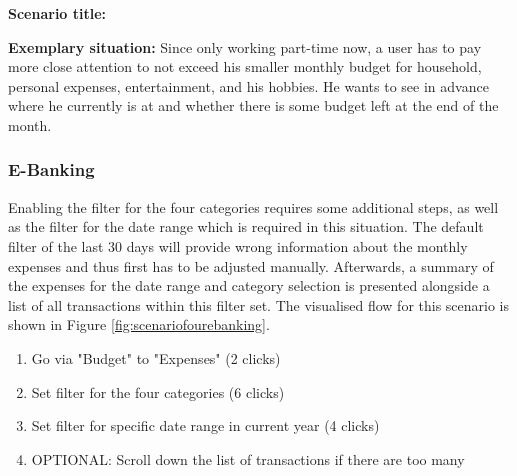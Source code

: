 \textbf{Scenario title:} \scenfour

\textbf{Exemplary situation:} Since only working part-time now, a user has to pay more close attention to not exceed his smaller monthly budget for household, personal expenses, entertainment, and his hobbies. He wants to see in advance where he currently is at and whether there is some budget left at the end of the month.



\subsubsection{E-Banking}

Enabling the filter for the four categories requires some additional steps, as well as the filter for the date range which is required in this situation. The default filter of the last 30 days will provide wrong information about the monthly expenses and thus first has to be adjusted manually. Afterwards, a summary of the expenses for the date range and category selection is presented alongside a list of all transactions within this filter set. The visualised flow for this scenario is shown in Figure \ref{fig:scenariofourebanking}.
\begin{enumerate}
	\item Go via "Budget" to "Expenses" (2 clicks)
	\item Set filter for the four categories (6 clicks)
	\item Set filter for specific date range in current year (4 clicks)
	\item OPTIONAL: Scroll down the list of transactions if there are too many
\end{enumerate}
